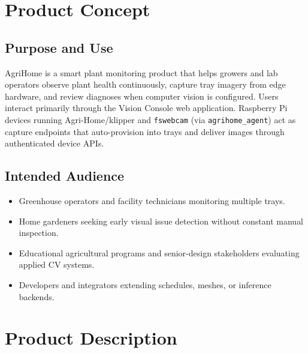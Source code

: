 \documentclass[11pt,letterpaper]{article}
\begin{document}
\section{Product Concept}
\subsection{Purpose and Use}
AgriHome is a smart plant monitoring product that helps growers and lab operators observe plant
health continuously, capture tray imagery from edge hardware, and review diagnoses when computer
vision is configured. Users interact primarily through the Vision Console web application. Raspberry
Pi devices running Agri-Home/klipper and \texttt{fswebcam} (via \texttt{agrihome\_agent}) act as
capture endpoints that auto-provision into trays and deliver images through authenticated device APIs.

\subsection{Intended Audience}
\begin{itemize}
  \item Greenhouse operators and facility technicians monitoring multiple trays.
  \item Home gardeners seeking early visual issue detection without constant manual inspection.
  \item Educational agricultural programs and senior-design stakeholders evaluating applied CV systems.
  \item Developers and integrators extending schedules, meshes, or inference backends.
\end{itemize}

\section{Product Description}
\end{document}
